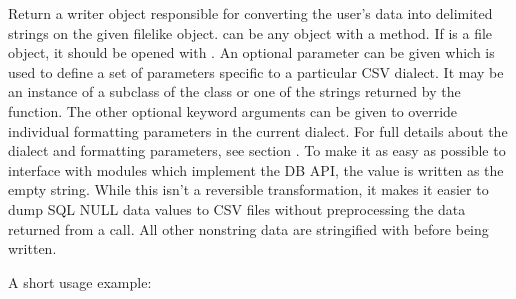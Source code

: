 \documentclass[letterpaper,10pt,english]{sphinxmanual}
\begin{document}
\begin{fulllineitems}
\label{\detokenize{csv:csv.writer}}
Return a writer object responsible for converting the user’s data into delimited
strings on the given file\sphinxhyphen{}like object.   can be any object with a
 method.  If  is a file object, it should be opened with
 \sphinxfootnotemark[1].  An optional 
parameter can be given which is used to define a set of parameters specific to a
particular CSV dialect.  It may be an instance of a subclass of the
{\hyperref[\detokenize{csv:csv.Dialect}]{}} class or one of the strings returned by the
{\hyperref[\detokenize{csv:csv.list_dialects}]{}} function.  The other optional  keyword arguments
can be given to override individual formatting parameters in the current
dialect.  For full details about the dialect and formatting parameters, see
section {\hyperref[\detokenize{csv:csv-fmt-params}]{}}. To make it
as easy as possible to interface with modules which implement the DB API, the
value  is written as the empty string.  While this isn’t a
reversible transformation, it makes it easier to dump SQL NULL data values to
CSV files without preprocessing the data returned from a  call.
All other non\sphinxhyphen{}string data are stringified with  before being written.

A short usage example:


\end{fulllineitems}
\end{document}
